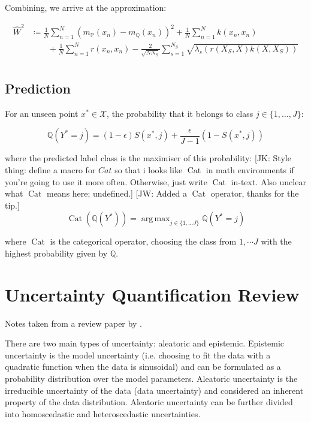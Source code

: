\documentclass[twoside,11pt]{article}
\newcommand{\jk}[1]{{\color{blue} [JK: #1]}}
\newcommand{\jw}[1]{{\color{gray} [JW: #1]}}
\newcommand{\Cat}{\operatorname{Cat}}
\DeclareMathOperator*{\argmax}{arg\,max}
\begin{document}
Combining, we arrive at the approximation:

\[
\begin{split}
\hat{W}^2 & \coloneqq \frac{1}{N}\sum_{n=1}^N (m_{\mathbb{P}}(x_n)-m_{\mathbb{Q}}(x_n))^2 + \frac{1}{N}\sum_{n=1}^{N}k(x_n, x_n) \\
 &\qquad +\frac{1}{N}\sum_{n=1}^{N}r(x_n, x_n) - \frac{2}{\sqrt {N N_S}}\sum_{s=1}^{N_S}\sqrt {\lambda_s(r(X_S, X)k(X, X_S))} \\
\end{split}\label{eq:w-2-distance-approx}
\]

\subsection{Prediction}\label{subsec:gwi-for-multiclass-classification-prediction}

For an unseen point $x^* \in \mathcal{X}$, the probability that it belongs to class $j \in \{1, \dots, J\}$:

\[\mathbb{Q}(Y^* = j) = (1-\epsilon) S(x^*, j) + \frac{\epsilon}{J-1}(1-S(x^*, j))\]

where the predicted label class is the maximiser  of this probability:
%
\jk{Style thing: define a macro for $Cat$ so that i looks like  $\operatorname{Cat}$ in math environments if you're going to use it more often. Otherwise, just write $\operatorname{Cat}$ in-text. Also unclear what $\operatorname{Cat}$ means here; undefined.}
\jw{Added a $\Cat$ operator, thanks for the tip.}
%
\[\Cat(\mathbb{Q}(Y^*)) = \argmax_{j \in \{1, \dots J\}} \mathbb{Q}(Y^* = j)\]

where $\Cat$ is the categorical operator, choosing the class from $1, \cdots J$ with the highest probability given by $\mathbb{Q}$.

\section{Uncertainty Quantification Review}\label{sec:uncertainty-quantification-review}
Notes taken from a review paper by \cite{abdar2021review}.

There are two main types of uncertainty: aleatoric and epistemic.
Epistemic uncertainty is the model uncertainty (i.e. choosing to fit the data with a quadratic function when the data is sinusoidal) and can be formulated as a probability distribution over the model parameters.
Aleatoric uncertainty is the irreducible uncertainty of the data (data uncertainty) and considered an inherent property of the data distribution.
Aleatoric uncertainty can be further divided into homoscedastic and heteroscedastic uncertainties.
\end{document}
